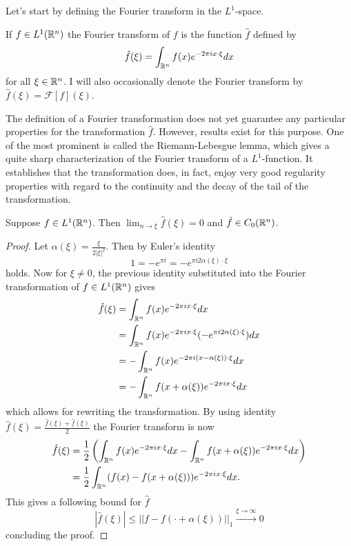 Let's start by defining the Fourier transform in the $L^1$-space.

\begin{definition}
    If $f\in L^1(\mathbb R^n)$ the Fourier transform of $f$ is the function $\hat{f}$ defined by 
    \begin{equation*}
        \hat{f}(\xi)=\int_{\mathbb R^n}f(x)e^{-2\pi i x\cdot \xi}dx
    \end{equation*}
    for all $\xi\in\mathbb R^n$. I will also occasionally denote the Fourier transform by $\hat{f}(\xi)=\mathcal{F}[f](\xi)$.
\end{definition}

The definition of a Fourier transformation does not yet guarantee any particular properties for the transformation $\hat{f}$. However, results exist for this purpose. One of the most prominent is called the Riemann-Lebesgue lemma, which gives a quite sharp characterization of the Fourier transform of a $L^1$-function. It establishes that the transformation does, in fact, enjoy very good regularity properties with regard to the continuity and the decay of the tail of the transformation.

\begin{lemma}
    Suppose $f\in L^1(\mathbb R^n)$. Then $\lim_{n\rightarrow\xi}\hat{f}(\xi)=0$ and $\hat{f}\in C_0(\mathbb R^n)$.
\end{lemma}
\begin{proof}
    Let $\alpha(\xi)=\frac{\xi}{2|\xi|^2}$. Then by Euler's identity
    \begin{equation*}
        1=-e^{\pi i}=-e^{\pi i2\alpha(\xi)\cdot\xi}
    \end{equation*}
    holds. Now for $\xi\neq0$, the previous identity substituted into the Fourier transformation of $f\in L^1(\mathbb R^n)$ gives
    \begin{align*}
        \hat{f}(\xi) &= \int_{\mathbb R^n}f(x)e^{-2\pi i x\cdot \xi }dx\\
        &= \int_{\mathbb R^n}f(x)e^{-2\pi i x\cdot \xi }(-e^{\pi i2\alpha(\xi)\cdot\xi})dx \\
        &= -\int_{\mathbb R^n}f(x)e^{-2\pi i (x-\alpha(\xi))\cdot \xi }dx \\
        &=-\int_{\mathbb R^n}f(x+\alpha(\xi))e^{-2\pi i x\cdot\xi}dx
    \end{align*}
    which allows for rewriting the transformation. By using identity $\hat{f}(\xi)=\frac{\hat{f}(\xi)+\hat{f}(\xi)}{2}$ the Fourier transform is now
    \begin{align*}
        \hat{f}(\xi) &= \frac{1}{2}\left(\int_{\mathbb R^n}f(x)e^{-2\pi i x\cdot \xi }dx-\int_{\mathbb R^n}f(x+\alpha(\xi))e^{-2\pi i x\cdot\xi}dx\right) \\
        &=\frac{1}{2}\int_{\mathbb R^n}(f(x)-f(x+\alpha(\xi)))e^{-2\pi i x\cdot\xi}dx.
    \end{align*}
    This gives a following bound for $\hat{f}$
    \begin{equation*}
        |\hat{f}(\xi)|\leq||f-f(\cdot+\alpha(\xi))||_1\xrightarrow{\xi\rightarrow\infty}0
    \end{equation*}
    concluding the proof.
\end{proof}

